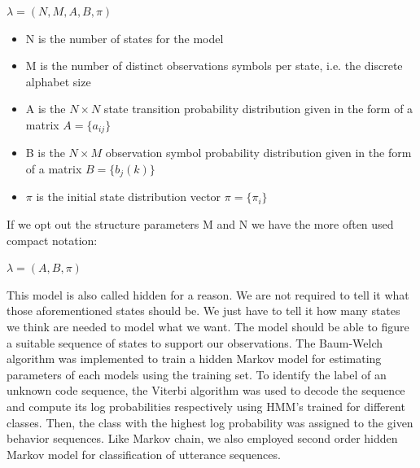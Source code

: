 \documentclass{amia}
\begin{document}
\begin{center}
$\lambda = (N, M, A, B, \pi)$
\end{center}

\begin{itemize}
\item N is the number of states for the model
\item M is the number of distinct observations symbols per state, i.e. the discrete alphabet size
\item A is the $N\times N$ state transition probability distribution given in the form of a matrix $A = \{a_{ij}\}$
\item B is the $N\times M$ observation symbol probability distribution given in the form of a matrix $B = \{b_j(k)\}$
\item $\pi$ is the initial state distribution vector $\pi = \{\pi_i\}$
\end{itemize}

If we opt out the structure parameters M and N we have the more often used compact notation:

\begin{center}
$\lambda = (A, B, \pi)$
\end{center} 

This model is also called hidden for a reason. We are not required to tell it what those aforementioned states should be. We just have to tell it how many states we think are needed to model what we want. The model should be able to figure a suitable sequence of states to support our observations. The Baum-Welch algorithm was implemented to train a hidden Markov model for estimating parameters of each models using the training set. To identify the label of an unknown code sequence, the Viterbi algorithm was used to decode the sequence and compute its log probabilities respectively using HMM's trained for different classes. Then, the class with the highest log probability was assigned to the given behavior sequences. Like Markov chain, we also employed second order hidden Markov model for classification of utterance sequences.   
\end{document}
